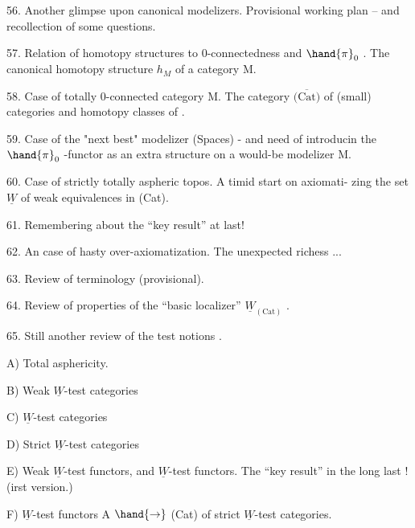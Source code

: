 56. Another glimpse upon canonical modelizers. Provisional working
plan -- and recollection of some questions.

57. Relation of homotopy structures to 0-connectedness and $\hand{\pi}_0$ . The
canonical homotopy structure $h_M$ of a category M.

58. Case of totally 0-connected category M. The category $\overline{\text{(Cat)}}$ of
(small) categories and homotopy classes of .

59. Case of the "next best" modelizer (Spaces) - and need of introducin
the $\hand{\pi}_0$ -functor as an extra structure\unsure{*} on a would-be modelizer M.

60. Case of  strictly totally aspheric topos. A timid start on axiomati-%
zing the set $\underline{W}$ of weak equivalences in (Cat).

61. Remembering about the  ``key result'' at last!

62. An  case of hasty over-axiomatization. The unexpected richess ...

63. Review of terminology (provisional).

64. Review of properties of the ``basic localizer'' $\underline{W}_{(\text{Cat})}$ .

65. Still another review of the test notions .

A) Total asphericity.

B) Weak $\underline{W}$-test categories

C) $\underline{W}$-test categories

D) Strict $\underline{W}$-test categories

E) Weak $\underline{W}$-test functors, and $\underline{W}$-test functors. The ``key result'' in
the long last ! (irst version\hand{\unsure{\deleted{)}}}.) 

F) $\underline{W}$-test functors A $\hand{\to}$ (Cat) of strict $\underline{W}$-test categories.

